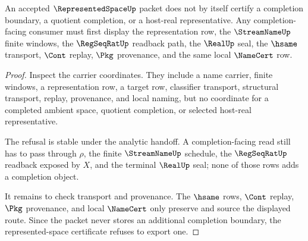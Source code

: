 \begin{theorem}
\label{thm:representedspace-completion-boundary-refusal}
An accepted $\RepresentedSpaceUp$ packet does not by itself certify a completion boundary, a quotient completion, or a host-real representative. Any completion-facing consumer must first display the representation row, the $\StreamNameUp$ finite windows, the $\RegSeqRatUp$ readback path, the $\RealUp$ seal, the $\hsame$ transport, $\Cont$ replay, $\Pkg$ provenance, and the same local $\NameCert$ row.
\end{theorem}
\begin{proof}
Inspect the carrier coordinates. They include a name carrier, finite windows, a representation row, a target row, classifier transport, structural transport, replay, provenance, and local naming, but no coordinate for a completed ambient space, quotient completion, or selected host-real representative.

The refusal is stable under the analytic handoff. A completion-facing read still has to pass through $\rho$, the finite $\StreamNameUp$ schedule, the $\RegSeqRatUp$ readback exposed by $X$, and the terminal $\RealUp$ seal; none of those rows adds a completion object.

It remains to check transport and provenance. The $\hsame$ rows, $\Cont$ replay, $\Pkg$ provenance, and local $\NameCert$ only preserve and source the displayed route. Since the packet never stores an additional completion boundary, the represented-space certificate refuses to export one.
\end{proof}

